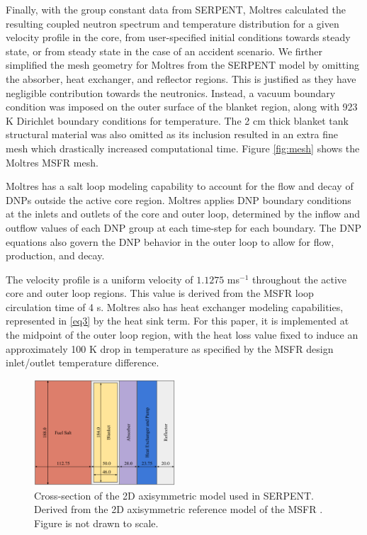 \documentclass{anstrans}
\begin{document}
	Finally, with the group constant data from SERPENT, Moltres
	calculated the resulting coupled neutron spectrum and temperature
	distribution for a given velocity profile in the core, from user-specified
	initial conditions towards steady state, or from steady state in the case
	of an accident scenario. We firther simplified the mesh geometry for
	Moltres from the SERPENT model by omitting the absorber,
	heat exchanger, and reflector regions. This is justified as they have
	negligible contribution towards the neutronics. Instead, a vacuum
	boundary condition was imposed on the outer surface of the blanket region,
	along with 923 K Dirichlet boundary conditions for temperature.
	The 2 cm thick blanket tank structural material was also omitted as its
	inclusion resulted in an extra fine mesh which drastically
	increased computational time. Figure \ref{fig:mesh} shows the Moltres
	\gls{MSFR} mesh.
	
	Moltres has a salt loop modeling capability to account for the flow and
	decay of
	\glspl{DNP} outside the active core region. Moltres applies \gls{DNP}
	boundary
	conditions at the inlets and outlets of the core and outer loop,
	determined by the inflow and outflow values of each \gls{DNP} group at
	each time-step for each boundary.
	The \gls{DNP} equations also govern the \gls{DNP} behavior in the outer
	loop to allow for flow, production, and decay.
	
	The velocity profile is a uniform velocity of $1.1275$ ms$^{-1}$ throughout
	the active core and outer loop regions. This value is derived from the
	\gls{MSFR} loop circulation time of 4 s. Moltres also has heat exchanger
	modeling capabilities, represented in \ref{eq3} by the heat sink term. For
	this paper, it is implemented at the midpoint of
	the outer loop region, with the heat loss value fixed to induce an
	approximately 100 K
	drop in temperature as specified by the \gls{MSFR} design inlet/outlet
	temperature difference.
	
\begin{figure}[h] 
	\centering
	\includegraphics[width=0.47\textwidth]{./figures/reference}
	\captionsetup{justification=centering}
	\caption{Cross-section of the 2D axisymmetric model used in SERPENT.
	Derived from the 2D axisymmetric reference model of the MSFR
	\cite{pettersen_coupled_2016}. Figure is not drawn to scale.}
	\label{fig:reference}
\end{figure} 
\end{document}
